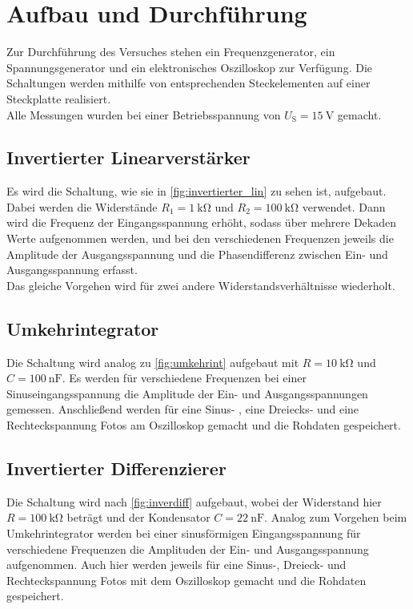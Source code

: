 \newpage
\section{Aufbau und Durchführung}

    \noindent 
    Zur Durchführung des Versuches stehen ein Frequenzgenerator, ein Spannungsgenerator und ein elektronisches Oszilloskop zur Verfügung. 
    Die Schaltungen werden mithilfe von entsprechenden Steckelementen auf einer Steckplatte realisiert. \\ 
    Alle Messungen wurden bei einer Betriebsspannung von $U_\text{S} = \SI{15}{\volt}$ gemacht.

    \subsection{Invertierter Linearverstärker}

        \noindent 
        Es wird die Schaltung, wie sie in \autoref{fig:invertierter_lin} zu sehen ist, aufgebaut. Dabei werden die Widerstände $R_1 = \SI{1}{\kilo\ohm}$ und 
        $R_2 = \SI{100}{\kilo\ohm}$ verwendet. Dann wird die Frequenz der Eingangsspannung erhöht, sodass über mehrere Dekaden Werte aufgenommen werden, und bei 
        den verschiedenen Frequenzen jeweils die Amplitude der Ausgangsspannung und die Phasendifferenz zwischen Ein- und Ausgangsspannung erfasst. \\
        Das gleiche Vorgehen wird für zwei andere Widerstandsverhältnisse wiederholt. 

    \subsection{Umkehrintegrator}

        \noindent 
        Die Schaltung wird analog zu \autoref{fig:umkehrint} aufgebaut mit $R = \SI{10}{\kilo\ohm}$ und $C = \SI{100}{\nano\farad}$. 
        Es werden für verschiedene Frequenzen bei einer Sinuseingangsspannung die Amplitude der Ein- und Ausgangsspannungen gemessen. 
        Anschließend werden für eine Sinus- , eine Dreiecks- und eine Rechteckspannung Fotos am Oszilloskop gemacht und die Rohdaten gespeichert.

    \subsection{Invertierter Differenzierer}

        \noindent
        Die Schaltung wird nach \autoref{fig:inverdiff} aufgebaut, wobei der Widerstand hier $R= \SI{100}{\kilo\ohm}$ beträgt und der Kondensator 
        $C = \SI{22}{\nano\farad}$. Analog zum Vorgehen beim Umkehrintegrator werden bei einer sinusförmigen Eingangsspannung für verschiedene 
        Frequenzen die Amplituden der Ein- und Ausgangsspannung aufgenommen. Auch hier werden jeweils für eine Sinus-, Dreieck- und Rechteckspannung 
        Fotos mit dem Oszilloskop gemacht und die Rohdaten gespeichert.

